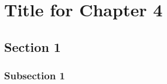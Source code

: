 
\chapter{Title for Chapter 4}\label{chapters:chapter_4}
\vspace{-7mm}

\section{Section 1}\label{sec:ch_4_sec_1}

\subsection{Subsection 1}\label{subsec:subsec_4.1.1}


\clearpage

